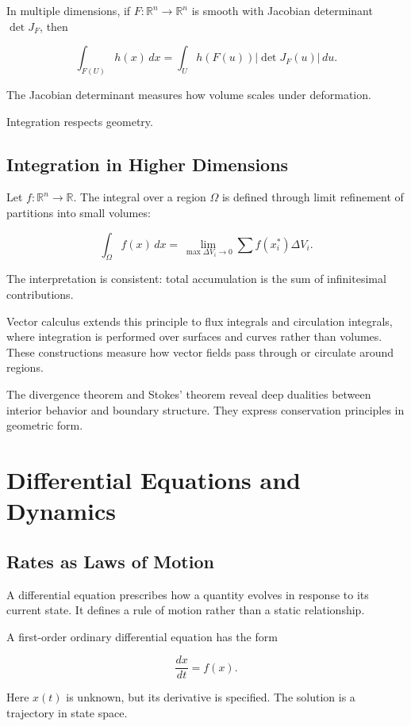 \documentclass[12pt]{book}
\begin{document}
In multiple dimensions, if $F : \mathbb{R}^n \to \mathbb{R}^n$ is smooth with Jacobian determinant $\det J_F$, then

\[
\int_{F(U)} h(x)\, dx = \int_U h(F(u)) |\det J_F(u)|\, du.
\]

The Jacobian determinant measures how volume scales under deformation.

Integration respects geometry.

\section{Integration in Higher Dimensions}

Let $f : \mathbb{R}^n \to \mathbb{R}$. The integral over a region $\Omega$ is defined through limit refinement of partitions into small volumes:

\[
\int_\Omega f(x)\, dx = \lim_{\max \Delta V_i \to 0} \sum f(x_i^*) \Delta V_i.
\]

The interpretation is consistent: total accumulation is the sum of infinitesimal contributions.

Vector calculus extends this principle to flux integrals and circulation integrals, where integration is performed over surfaces and curves rather than volumes. These constructions measure how vector fields pass through or circulate around regions.

The divergence theorem and Stokes' theorem reveal deep dualities between interior behavior and boundary structure. They express conservation principles in geometric form.

\chapter{Differential Equations and Dynamics}

\section{Rates as Laws of Motion}

A differential equation prescribes how a quantity evolves in response to its current state. It defines a rule of motion rather than a static relationship.

A first-order ordinary differential equation has the form

\[
\frac{dx}{dt} = f(x).
\]

Here $x(t)$ is unknown, but its derivative is specified. The solution is a trajectory in state space.
\end{document}
